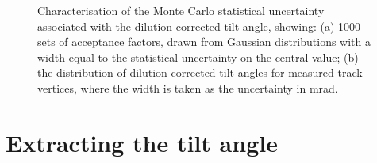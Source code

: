 \begin{figure}[t!]
\centering{}
\caption{Characterisation of the Monte Carlo statistical uncertainty associated with the dilution corrected tilt angle, showing: (a) 1000 sets of acceptance factors, drawn from Gaussian distributions with a width equal to the statistical uncertainty on the central value; (b) the distribution of dilution corrected tilt angles for measured track vertices, where the width is taken as the uncertainty in mrad.} 
\label{fig:AcceptanceStatError}
\end{figure} 

\section{Extracting the tilt angle}\label{sec:ExtractTiltSim}

